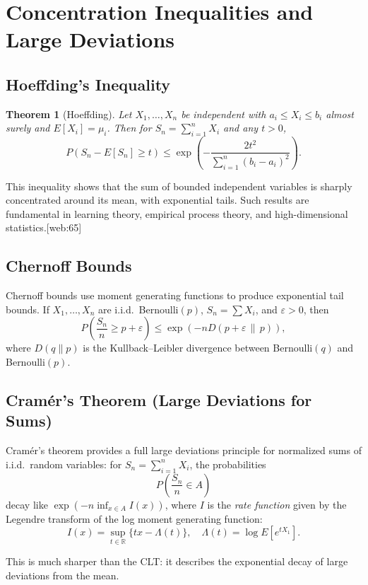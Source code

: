 \documentclass[11pt,a4paper]{article}
\newtheorem{theorem}{Theorem}[section]
\numberwithin{equation}{section}
\begin{document}
\section{Concentration Inequalities and Large Deviations}
\label{sec:concentration}

\subsection{Hoeffding's Inequality}

\begin{theorem}[Hoeffding]
Let $X_1,\dots,X_n$ be independent with $a_i \le X_i \le b_i$ almost surely and $E[X_i]=\mu_i$. 
Then for $S_n = \sum_{i=1}^n X_i$ and any $t>0$,
\[
P(S_n - E[S_n] \ge t)
\le \exp\left(-\frac{2t^2}{\sum_{i=1}^n (b_i-a_i)^2}\right).
\]
\end{theorem}

This inequality shows that the sum of bounded independent variables is sharply concentrated around its mean, with exponential tails. 
Such results are fundamental in learning theory, empirical process theory, and high-dimensional statistics.[web:65]

\subsection{Chernoff Bounds}

Chernoff bounds use moment generating functions to produce exponential tail bounds. 
If $X_1,\dots,X_n$ are i.i.d.\ Bernoulli$(p)$, $S_n = \sum X_i$, and $\varepsilon>0$, then
\[
P\left(\frac{S_n}{n} \ge p + \varepsilon\right)
\le \exp(-n D(p+\varepsilon \,\|\, p)),
\]
where $D(q\|p)$ is the Kullback--Leibler divergence between Bernoulli$(q)$ and Bernoulli$(p)$.

\subsection{Cram\'er’s Theorem (Large Deviations for Sums)}

Cram\'er's theorem provides a full large deviations principle for normalized sums of i.i.d.\ random variables: for $S_n=\sum_{i=1}^n X_i$, the probabilities
\[
P\left(\frac{S_n}{n} \in A\right)
\]
decay like $\exp(-n \inf_{x\in A} I(x))$, where $I$ is the \emph{rate function} given by the Legendre transform of the log moment generating function:
\[
I(x) = \sup_{t\in\mathbb{R}} \{tx - \Lambda(t)\},
\quad \Lambda(t) = \log E[e^{tX_1}].
\]

This is much sharper than the CLT: it describes the exponential decay of large deviations from the mean.
\end{document}
